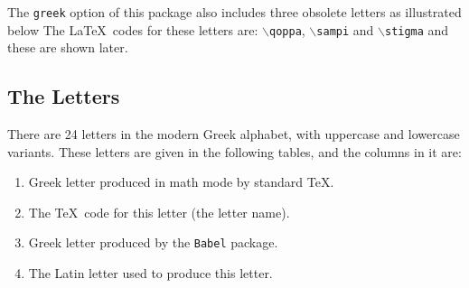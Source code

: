 The \texttt{greek} option of this package also includes three obsolete letters as illustrated below The \LaTeX\ codes for these letters are: $\backslash$\texttt{qoppa}, $\backslash$\texttt{sampi} and $\backslash$\texttt{stigma} and these are shown later.

\subsection{The Letters}
 There are 24 letters in the modern Greek alphabet, with uppercase and lowercase variants. These letters are given in the following tables, and the columns in it are:
\begin{enumerate}
	\item Greek letter produced in math mode by standard \TeX.
	\item The \TeX\ code for this letter (the letter name).
	\item Greek letter produced by the \texttt{Babel} package.
	\item The Latin letter used to produce this letter.
\end{enumerate}

